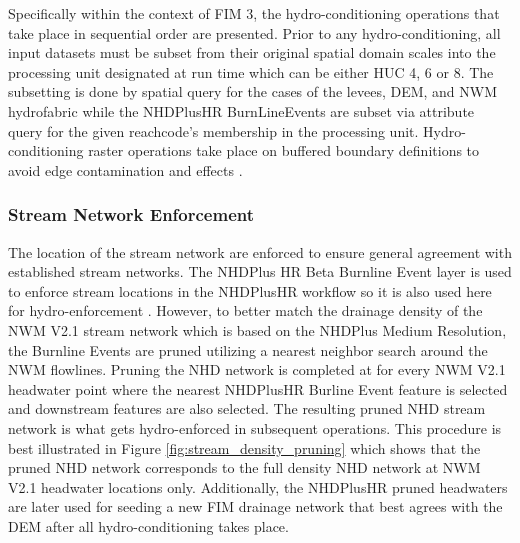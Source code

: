 Specifically within the context of FIM 3, the hydro-conditioning operations that take place in sequential order are presented. 
Prior to any hydro-conditioning, all input datasets must be subset from their original spatial domain scales into the processing unit designated at run time which can be either HUC 4, 6 or 8. 
The subsetting is done by spatial query for the cases of the levees, DEM, and NWM hydrofabric while the NHDPlusHR BurnLineEvents are subset via attribute query for the given reachcode's membership in the processing unit.
Hydro-conditioning raster operations take place on buffered boundary definitions to avoid edge contamination and effects \cite{lindsay2013measuring}. 
%
\subsubsection{Stream Network Enforcement} 
\label{ssec:stream_network_enforcment}
%
The location of the stream network are enforced to ensure general agreement with established stream networks.
The NHDPlus HR Beta Burnline Event layer is used to enforce stream locations in the NHDPlusHR workflow so it is also used here for hydro-enforcement \cite{moore2019user}. 
However, to better match the drainage density of the NWM V2.1 stream network which is based on the NHDPlus Medium Resolution, the Burnline Events are pruned utilizing a nearest neighbor search around the NWM flowlines. 
Pruning the NHD network is completed at for every NWM V2.1 headwater point where the nearest NHDPlusHR Burline Event feature is selected and downstream features are also selected.
The resulting pruned NHD stream network is what gets hydro-enforced in subsequent operations.
This procedure is best illustrated in Figure \ref{fig:stream_density_pruning} which shows that the pruned NHD network corresponds to the full density NHD network at NWM V2.1 headwater locations only. 
Additionally, the NHDPlusHR pruned headwaters are later used for seeding a new FIM drainage network that best agrees with the DEM after all hydro-conditioning takes place.
%

